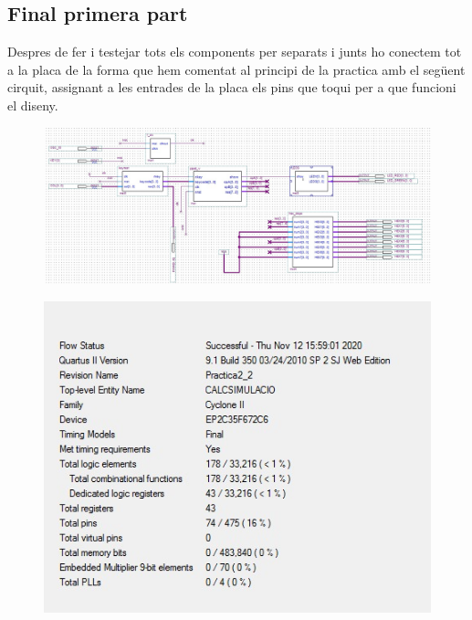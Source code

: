 \documentclass[12pt, a4papre]{article}
\begin{document}
	\subsection{Final primera part}
	
	Despres de fer i testejar tots els components per separats i junts ho conectem tot a la placa de la forma que hem comentat al principi de la practica amb el següent cirquit, assignant a les entrades de la placa els pins que toqui per a que funcioni el diseny.
	
	\begin{figure}[H]
		\begin{center}
		\includegraphics[width=130mm]{FinalDiseny.jpeg}
		\end{center}
	\end{figure}
	
	\begin{figure}[H]
		\begin{center}
		\includegraphics[width=130mm]{informeFINAL.jpeg}
		\end{center}
	\end{figure}
	
\end{document}
